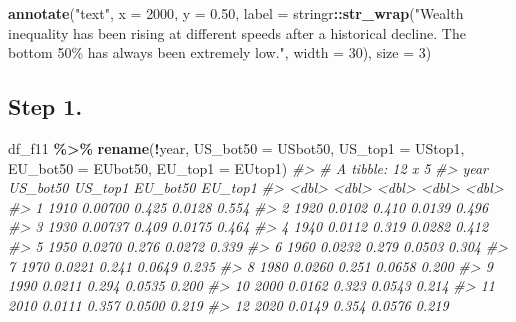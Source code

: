 \documentclass[
  xelatex, ja=standard]{bxjsbook}
\newenvironment{Shaded}{\begin{snugshade}}{\end{snugshade}}
\newcommand{\AttributeTok}[1]{\textcolor[rgb]{0.13,0.29,0.53}{#1}}
\newcommand{\CommentTok}[1]{\textcolor[rgb]{0.56,0.35,0.01}{\textit{#1}}}
\newcommand{\DecValTok}[1]{\textcolor[rgb]{0.00,0.00,0.81}{#1}}
\newcommand{\FloatTok}[1]{\textcolor[rgb]{0.00,0.00,0.81}{#1}}
\newcommand{\FunctionTok}[1]{\textcolor[rgb]{0.13,0.29,0.53}{\textbf{#1}}}
\newcommand{\NormalTok}[1]{#1}
\newcommand{\SpecialCharTok}[1]{\textcolor[rgb]{0.81,0.36,0.00}{\textbf{#1}}}
\newcommand{\StringTok}[1]{\textcolor[rgb]{0.31,0.60,0.02}{#1}}
\theoremstyle{definition}
\theoremstyle{definition}
\theoremstyle{definition}
\theoremstyle{definition}
\theoremstyle{remark}
\begin{document}
\begin{Shaded}
\begin{Highlighting}[]
  \FunctionTok{annotate}\NormalTok{(}\StringTok{"text"}\NormalTok{, }\AttributeTok{x =} \DecValTok{2000}\NormalTok{, }\AttributeTok{y =} \FloatTok{0.50}\NormalTok{, }
      \AttributeTok{label =}\NormalTok{ stringr}\SpecialCharTok{::}\FunctionTok{str\_wrap}\NormalTok{(}\StringTok{"Wealth inequality has been rising at }
\StringTok{        different speeds after a historical decline. The bottom 50\% has always been }
\StringTok{                                extremely low."}\NormalTok{, }\AttributeTok{width =} \DecValTok{30}\NormalTok{), }\AttributeTok{size =} \DecValTok{3}\NormalTok{)}
\end{Highlighting}
\end{Shaded}

\hypertarget{step-1.}{%
\subsection{Step 1.}\label{step-1.}}

\begin{Shaded}
\begin{Highlighting}[]
\NormalTok{df\_f11 }\SpecialCharTok{\%\textgreater{}\%} \FunctionTok{rename}\NormalTok{(}\SpecialCharTok{!}\NormalTok{year, }\AttributeTok{US\_bot50 =}\NormalTok{ USbot50, }\AttributeTok{US\_top1 =}\NormalTok{ UStop1, }
                  \AttributeTok{EU\_bot50 =}\NormalTok{ EUbot50, }\AttributeTok{EU\_top1 =}\NormalTok{ EUtop1) }
\CommentTok{\#\textgreater{} \# A tibble: 12 x 5}
\CommentTok{\#\textgreater{}     year US\_bot50 US\_top1 EU\_bot50 EU\_top1}
\CommentTok{\#\textgreater{}    \textless{}dbl\textgreater{}    \textless{}dbl\textgreater{}   \textless{}dbl\textgreater{}    \textless{}dbl\textgreater{}   \textless{}dbl\textgreater{}}
\CommentTok{\#\textgreater{}  1  1910  0.00700   0.425   0.0128   0.554}
\CommentTok{\#\textgreater{}  2  1920  0.0102    0.410   0.0139   0.496}
\CommentTok{\#\textgreater{}  3  1930  0.00737   0.409   0.0175   0.464}
\CommentTok{\#\textgreater{}  4  1940  0.0112    0.319   0.0282   0.412}
\CommentTok{\#\textgreater{}  5  1950  0.0270    0.276   0.0272   0.339}
\CommentTok{\#\textgreater{}  6  1960  0.0232    0.279   0.0503   0.304}
\CommentTok{\#\textgreater{}  7  1970  0.0221    0.241   0.0649   0.235}
\CommentTok{\#\textgreater{}  8  1980  0.0260    0.251   0.0658   0.200}
\CommentTok{\#\textgreater{}  9  1990  0.0211    0.294   0.0535   0.200}
\CommentTok{\#\textgreater{} 10  2000  0.0162    0.323   0.0543   0.214}
\CommentTok{\#\textgreater{} 11  2010  0.0111    0.357   0.0500   0.219}
\CommentTok{\#\textgreater{} 12  2020  0.0149    0.354   0.0576   0.219}
\end{Highlighting}
\end{Shaded}
\end{document}
